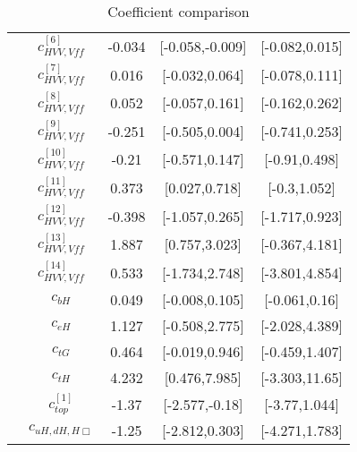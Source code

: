 \documentclass{article}
\begin{document}
\begin{table}[H]
\begin{tabular}{|c|c|c|c|c|}
 & $c_{HVV,Vff}^{[6]}$ & -0.034                             & [-0.058,-0.009]                                 & [-0.082,0.015] \\ \cline{2-5}
 & $c_{HVV,Vff}^{[7]}$ & 0.016                             & [-0.032,0.064]                                 & [-0.078,0.111] \\ \cline{2-5}
 & $c_{HVV,Vff}^{[8]}$ & 0.052                             & [-0.057,0.161]                                 & [-0.162,0.262] \\ \cline{2-5}
 & $c_{HVV,Vff}^{[9]}$ & -0.251                             & [-0.505,0.004]                                 & [-0.741,0.253] \\ \cline{2-5}
 & $c_{HVV,Vff}^{[10]}$ & -0.21                             & [-0.571,0.147]                                 & [-0.91,0.498] \\ \cline{2-5}
 & $c_{HVV,Vff}^{[11]}$ & 0.373                             & [0.027,0.718]                                 & [-0.3,1.052] \\ \cline{2-5}
 & $c_{HVV,Vff}^{[12]}$ & -0.398                             & [-1.057,0.265]                                 & [-1.717,0.923] \\ \cline{2-5}
 & $c_{HVV,Vff}^{[13]}$ & 1.887                             & [0.757,3.023]                                 & [-0.367,4.181] \\ \cline{2-5}
 & $c_{HVV,Vff}^{[14]}$ & 0.533                             & [-1.734,2.748]                                 & [-3.801,4.854] \\ \cline{2-5}
 & $c_{bH}$ & 0.049                             & [-0.008,0.105]                                 & [-0.061,0.16] \\ \cline{2-5}
 & $c_{eH}$ & 1.127                             & [-0.508,2.775]                                 & [-2.028,4.389] \\ \cline{2-5}
 & $c_{tG}$ & 0.464                             & [-0.019,0.946]                                 & [-0.459,1.407] \\ \cline{2-5}
 & $c_{tH}$ & 4.232                             & [0.476,7.985]                                 & [-3.303,11.65] \\ \cline{2-5}
 & $c_{top}^{[1]}$ & -1.37                             & [-2.577,-0.18]                                 & [-3.77,1.044] \\ \cline{2-5}
 & $c_{uH,dH,H\Box}$ & -1.25                             & [-2.812,0.303]                                 & [-4.271,1.783] \\ \cline{2-5}
\hline
\end{tabular}
\caption{Coefficient comparison}
\end{table}
\end{document}
